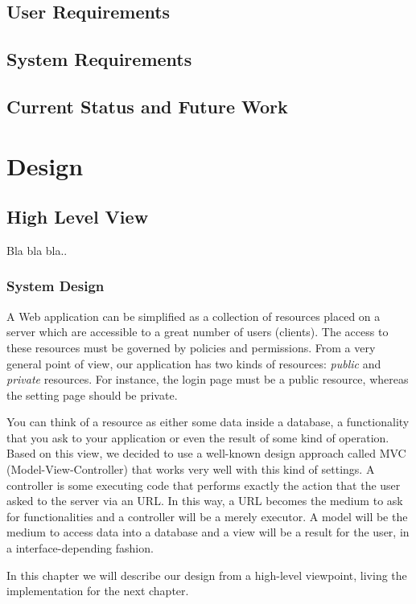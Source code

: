 \documentclass[12pt]{report}
\begin{document}
\chapter{User Requirements}
\chapter{System Requirements}
\chapter{Current Status and Future Work}


\part{Design}

\chapter{High Level View}
Bla bla bla..

\section{System Design}
A Web application can be simplified as a collection of resources placed on a server which are accessible to a great number of users (clients). The access to these resources must be governed by policies and permissions. From a very general point of view, our application has two kinds of resources: \emph{public} and \emph{private} resources. For instance, the login page must be a public resource, whereas the setting page should be private.

You can think of a resource as either some data inside a database, a functionality that you ask to your application or even the result of some kind of operation. Based on this view, we decided to use a well-known design approach called MVC (Model-View-Controller) that works very well with this kind of settings. A controller is some executing code that performs exactly the action that the user asked to the server via an URL. In this way, a URL becomes the medium to ask for functionalities and a controller will be a merely executor. A model will be the medium to access data into a database and a view will be a result for the user, in a interface-depending fashion.

In this chapter we will describe our design from a high-level viewpoint, living the implementation for the next chapter.
\end{document}
